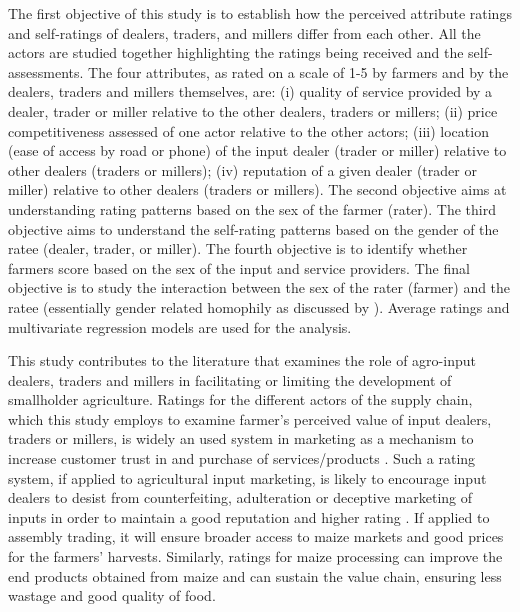 \documentclass[12pt,english]{article}\usepackage[]{graphicx}\usepackage[]{color}
\begin{document}
\begin{onehalfspace}
The first objective of this study is to establish how the perceived
attribute ratings and self-ratings of dealers, traders, and millers
differ from each other. All the actors are studied together highlighting
the ratings being received and the self-assessments. The four attributes,
as rated on a scale of 1-5 by farmers and by the dealers, traders
and millers themselves, are: (i) quality of service provided by a
dealer, trader or miller relative to the other dealers, traders or
millers; (ii) price competitiveness assessed of one actor relative
to the other actors; (iii) location (ease of access by road or phone)
of the input dealer (trader or miller) relative to other dealers (traders
or millers); (iv) reputation of a given dealer (trader or miller)
relative to other dealers (traders or millers). The second objective
aims at understanding rating patterns based on the sex of the farmer
(rater). The third objective aims to understand the self-rating patterns
based on the gender of the ratee (dealer, trader, or miller). The
fourth objective is to identify whether farmers score based on the
sex of the input and service providers. The final objective is to
study the interaction between the sex of the rater (farmer) and the
ratee (essentially gender related homophily as discussed by \citet{mcpherson2001birds}).
Average ratings and multivariate regression models are used for the
analysis.

This study contributes to the literature that examines the role of
agro-input dealers, traders and millers in facilitating or limiting
the development of smallholder agriculture. Ratings for the different
actors of the supply chain, which this study employs to examine farmer's
perceived value of input dealers, traders or millers, is widely an
used system in marketing as a mechanism to increase customer trust
in and purchase of services/products \citep{Jayashankar2018,Chiu2014}.
Such a rating system, if applied to agricultural input marketing,
is likely to encourage input dealers to desist from counterfeiting,
adulteration or deceptive marketing of inputs in order to maintain
a good reputation and higher rating \citep{Kim2013,Bente2012,BarIsaac2008}.
If applied to assembly trading, it will ensure broader access to maize
markets and good prices for the farmers' harvests. Similarly, ratings
for maize processing can improve the end products obtained from maize
and can sustain the value chain, ensuring less wastage and good quality
of food.


\end{onehalfspace}
\end{document}
